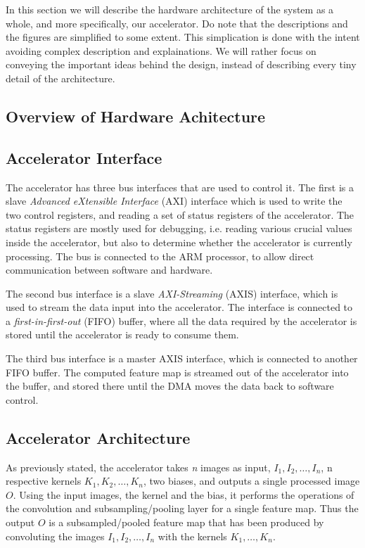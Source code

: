 In this section we will describe the hardware architecture of the system as a whole, and more specifically, our accelerator. Do note that the descriptions and the figures are simplified to some extent. This simplication is done with the intent avoiding complex description and explainations. We will rather focus on conveying the important ideas behind the design, instead of describing every tiny detail of the architecture. 

\subsection{Overview of Hardware Achitecture}


\subsection{Accelerator Interface}

The accelerator has three bus interfaces that are used to control it. The first is a slave \textit{Advanced eXtensible Interface} (AXI) interface which is used to write the two control registers, and reading a set of status registers of the accelerator. The status registers are mostly used for debugging, i.e. reading various crucial values inside the accelerator, but also to determine whether the accelerator is currently processing. The bus is connected to the ARM processor, to allow direct communication between software and hardware.

The second bus interface is a slave \textit{AXI-Streaming} (AXIS) interface, which is used to stream the data input into the accelerator. The interface is connected to a \textit{first-in-first-out} (FIFO) buffer, where all the data required by the accelerator is stored until the accelerator is ready to consume them. 

The third bus interface is a master AXIS interface, which is connected to another FIFO buffer. The computed feature map is streamed out of the accelerator into the buffer, and stored there until the DMA  moves the data back to software control.

 



\subsection{Accelerator Architecture}

As previously stated, the accelerator takes \textit{n} images as input, $ I_1, I_2, \dots, I_n $, n respective kernels $ K_1, K_2, \dots, K_n $, two biases, and outputs a single processed image $ O $. Using the input images, the kernel and the bias, it performs the operations of the convolution and subsampling/pooling layer for a single feature map. Thus the output $ O $ is a subsampled/pooled feature map that has been produced by convoluting the images $ I_1, I_2, \dots, I_n $ with the kernels $ K_1, \dots, K_n $. 

